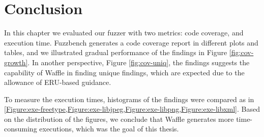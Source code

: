 \clearpage
\section{Conclusion}
\label{sec:ch5-conclusion}


In this chapter we evaluated our fuzzer with two metrics: code coverage, and execution time. Fuzzbench generates a code coverage report in different plots and tables, and we illustrated gradual performance of the findings in Figure \ref{fig:cov-growth}. In another perspective, Figure \ref{fig:cov-uniq}, the findings suggests the capability of Waffle in finding unique findings, which are expected due to the allowance of ERU-based guidance.

To measure the execution times, histograms of the findings were compared as in \cref{Figure:exe-freetype,Figure:exe-libjpeg,Figure:exe-libpng,Figure:exe-libxml}. Based on the distribution of the figures, we conclude that Waffle generates more time-consuming executions, which was the goal of this thesis.